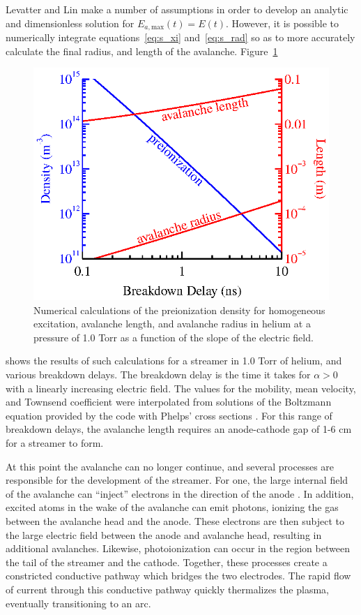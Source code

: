 {Levatter and Lin make a number of assumptions in order to develop an analytic
and dimensionless solution for $E_{a,\mathrm{max}}(t) = E(t)$. However, it is
possible to numerically integrate equations~\ref{eq:s_xi} and~\ref{eq:s_rad} so
as to more accurately calculate the final radius, and length of the avalanche.
Figure~\ref{fig:he_avalanche}
\begin{figure}
  \centering
  \includegraphics{./chapters/theory/figures/he_avalanche.eps}
  \caption{Numerical calculations of the preionization density for homogeneous
    excitation, avalanche length, and avalanche radius in helium at a pressure
    of 1.0 Torr as a function of the slope of the electric field.}
  \label{fig:he_avalanche}
\end{figure}
shows the results of such calculations for a streamer in 1.0 Torr of helium, and
various breakdown delays. The breakdown delay is the time it takes for $\alpha >
0$ with a linearly increasing electric field. The values for the mobility, mean
velocity, and Townsend coefficient were interpolated from solutions of the
Boltzmann equation provided by the  code with Phelps' cross
sections \cite{Phelps2002}. For this range of breakdown delays, the avalanche
length requires an anode-cathode gap of 1-6 cm for a streamer to form.

At this point the avalanche can no longer continue, and several processes are
responsible for the development of the streamer. For one, the large internal
field of the avalanche can ``inject'' electrons in the direction of the anode
\cite{Kunhardt1980}. In addition, excited atoms in the wake of the avalanche can
emit photons, ionizing the gas between the avalanche head and the anode. These
electrons are then subject to the large electric field between the anode and
avalanche head, resulting in additional avalanches. Likewise, photoionization
can occur in the region between the tail of the streamer and the cathode.
Together, these processes create a constricted conductive pathway which bridges
the two electrodes. The rapid flow of current through this conductive pathway
quickly thermalizes the plasma, eventually transitioning to an arc.

}
